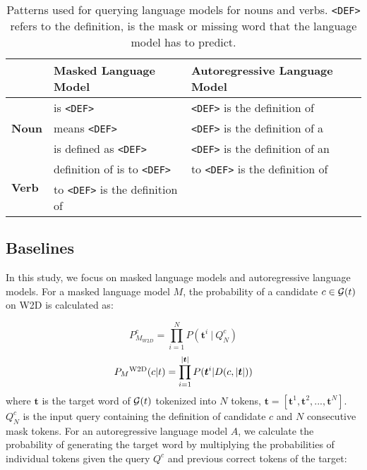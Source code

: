 \documentclass[11pt,a4paper]{article}
\def\uprm#1#2{_#2\mbox{$^{\hbox{\scriptsize #1}}$}}
\begin{document}
\begin{table*}
\centering
\begin{tabular}{lll}
\hline
& \textbf{Masked Language Model} & \textbf{Autoregressive Language Model}\\ \hline
\multirow{3}{*}{\textbf{Noun}} & \underline{\hspace{3mm}} is \texttt{<DEF>} & \texttt{<DEF>} is the definition of \underline{\hspace{3mm}} \\
 & \underline{\hspace{3mm}} means \texttt{<DEF>} & \texttt{<DEF>} is the definition of a \underline{\hspace{3mm}} \\
 & \underline{\hspace{3mm}} is defined as \texttt{<DEF>} & \texttt{<DEF>} is the definition of an \underline{\hspace{3mm}}\\ \hline
 \multirow{2}{*}{\textbf{Verb}} & definition of \underline{\hspace{3mm}} is to \texttt{<DEF>} & to \texttt{<DEF>} is the definition of \underline{\hspace{3mm}} \\
 & to \texttt{<DEF>} is the definition of \underline{\hspace{3mm}} & \\ \hline
 
\end{tabular}
\caption{Patterns used for querying language models for
  nouns and verbs.
\texttt{<DEF>} refers to the definition,
\underline{\hspace{3mm}} is the mask or missing word that
the language model has to predict.}
\label{tab:patterns}
\end{table*}

\subsection{Baselines}

  
In this study, we focus on masked language models and
autoregressive language models. For a masked language model
$M$, the probability of a candidate $c \in {\cal G}(t)$ on W2D  is calculated as:

\begin{equation*}
    P_{M_{W2D}}^c = \prod_{i=1}^{N}P(\bm{t}^i~|~Q_{N}^{c})
\end{equation*}
\begin{equation*}
  P\uprm{W2D}{M} (c|t) = \prod_{i=1}^{|\bm{t}|}P(\bm{t}^i|D(c,|\bm{t}|))
\end{equation*}
where $\bm{t}$ is the target word of ${\cal G}(t)$ tokenized into $N$ tokens, $\bm{t} = [\bm{t}^1, \bm{t}^2,...,\bm{t}^N]$. $Q_{N}^{c}$ is the input query containing the definition of candidate $c$ and $N$ consecutive mask tokens. For an autoregressive language model $A$, we calculate the probability of generating the target word by multiplying the probabilities of individual tokens given the query $Q^c$ and previous correct tokens of the target:
\end{document}
